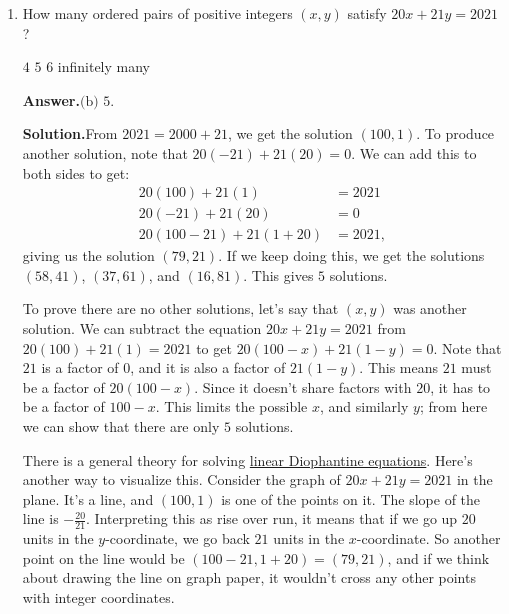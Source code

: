 \documentclass[11pt,paper=letter]{scrartcl}
\newcommand{\ansb}[2]{{\sffamily \bfseries Answer.}\;\(\boxed{\text{(#1) #2}}\).}
\newcommand{\sol}{{\sffamily \bfseries Solution.}\;}
\newenvironment{rem}%
{\noindent \ignorespaces \small \sffamily \sansmath {\bfseries Remark.}}%
{\ignorespacesafterend}
\begin{document}
\begin{enumerate}[align=left,leftmargin=*]
\ansb{d}{$720$}

\sol We do complementary counting: count the total number of arrangements, and then subtract the ones where the $A$s are all together. The total number of arrangements is $\frac{7!}{3!}$. There are $7$ letters, but we overcounted by a factor of $3!$, because the $A$s can be arranged in $3!$ ways without changing the arrangement.

The number of arrangements where the $A$s are all together is $5!$. You can imagine combining the $A$s as a single, big letter $AAA$. Then there would be $5$ letters to arrange. The final answer is \[
  \frac{7!}{3!} - 5! = \frac{7 \cdot 6 \cdot 5!}{3!} - 5! = 5!\left(\frac{7 \cdot 6}{3!} - 1\right) = 720.
\]

\item How many ordered pairs of positive integers $(x, y)$ satisfy $20x + 21y = 2021$?

\fourch
{$4$}
{$5$}
{$6$}
{infinitely many}

\ansb{b}{$5$}

\sol From $2021 = 2000 + 21$, we get the solution $(100, 1)$. To produce another solution, note that $20(-21) + 21(20) = 0$. We can add this to both sides to get:
\begin{align*}
20(100) + 21(1) &= 2021 \\
20(-21) + 21(20) &= 0 \\
20(100 - 21) + 21(1 + 20) &= 2021,
\end{align*}
giving us the solution $(79, 21)$. If we keep doing this, we get the solutions $(58, 41)$, $(37, 61)$, and $(16, 81)$. This gives $5$ solutions.

To prove there are no other solutions, let's say that $(x, y)$ was another solution. We can subtract the equation $20x + 21y = 2021$ from $20(100) + 21(1) = 2021$ to get $20(100 - x) + 21(1 - y) = 0$. Note that $21$ is a factor of $0$, and it is also a factor of $21(1 - y)$. This means $21$ must be a factor of $20(100 - x)$. Since it doesn't share factors with $20$, it has to be a factor of $100 - x$. This limits the possible $x$, and similarly $y$; from here we can show that there are only $5$ solutions.

\begin{rem}
There is a general theory for solving \href{https://en.wikipedia.org/wiki/Diophantine_equation#One_equation}{linear Diophantine equations}. Here's another way to visualize this. Consider the graph of $20x + 21y = 2021$ in the plane. It's a line, and $(100, 1)$ is one of the points on it. The slope of the line is $-\frac{20}{21}$. Interpreting this as rise over run, it means that if we go up $20$ units in the $y$-coordinate, we go back $21$ units in the $x$-coordinate. So another point on the line would be $(100 - 21, 1 + 20) = (79, 21)$, and if we think about drawing the line on graph paper, it wouldn't cross any other points with integer coordinates.
\end{rem}


\end{enumerate}
\end{document}
